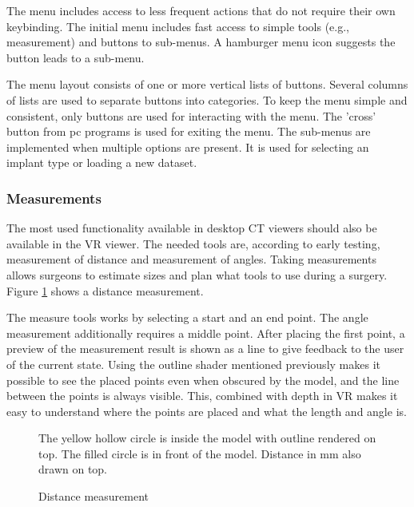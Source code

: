 \documentclass[a4paper]{report}
\begin{document}
The menu includes access to less frequent actions that do not require their own keybinding. The initial menu includes fast access to simple tools (e.g., measurement) and buttons to sub-menus. A hamburger menu icon suggests the button leads to a sub-menu.

The menu layout consists of one or more vertical lists of buttons. Several columns of lists are used to separate buttons into categories. To keep the menu simple and consistent, only buttons are used for interacting with the menu. The 'cross' button from pc programs is used for exiting the menu.
The sub-menus are implemented when multiple options are present. It is used for selecting an implant type or loading a new dataset.


\subsubsection{Measurements}
The most used functionality available in desktop CT viewers should also be available in the VR viewer. The needed tools are, according to early testing, measurement of distance and measurement of angles. Taking measurements allows surgeons to estimate sizes and plan what tools to use during a surgery.
Figure \ref{measure} shows a distance measurement.

The measure tools works by selecting a start and an end point. The angle measurement additionally requires a middle point.
After placing the first point, a preview of the measurement result is shown as a line to give feedback to the user of the current state.
Using the outline shader mentioned previously makes it possible to see the placed points even when obscured by the model, and the line between the points is always visible. This, combined with depth in VR makes it easy to understand where the points are placed and what the length and angle is.

\begin{figure}[h!]
    \centering
	\hfill
	\caption{Distance measurement}\label{measure}
  \small
  The yellow hollow circle is inside the model with outline rendered on top. The filled circle is in front of the model. Distance in mm also drawn on top.
\end{figure}
\end{document}
